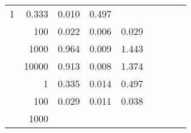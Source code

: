 \begin{table}
\begin{tabular}{rrrrrrrrr}
					\multirow{ 1 }{*}{ 1 } &
					
						
							    
							    
	                           0.333 & 0.010 & 0.497  \\
	                
	            
					 &  
					 
					\multirow{ 1 }{*}{ 100 } &
					
						
							    
							    
	                           0.022 & 0.006 & 0.029  \\
	                
	            
					 &  
					 
					\multirow{ 1 }{*}{ 1000 } &
					
						
							    
							    
	                           0.964 & 0.009 & 1.443  \\
	                
	            
					 &  
					 
					\multirow{ 1 }{*}{ 10000 } &
					
						
							    
							    
	                           0.913 & 0.008 & 1.374  \\
	                
	            
	        
				\noalign{\smallskip}\hline
				\multirow{ 4 }{*}{ 160000 } &
				
					
					 
					\multirow{ 1 }{*}{ 1 } &
					
						
							    
							    
	                           0.335 & 0.014 & 0.497  \\
	                
	            
					 &  
					 
					\multirow{ 1 }{*}{ 100 } &
					
						
							    
							    
	                           0.029 & 0.011 & 0.038  \\
	                
	            
					 &  
					 
					\multirow{ 1 }{*}{ 1000 } &
					
						
							    

\end{tabular}
\end{table}
